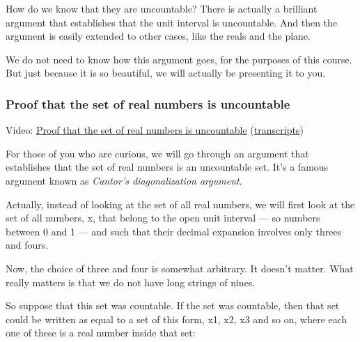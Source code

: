 \documentclass[pdftex, brazil, 12pt, twoside]{article}
\begin{document}
How do we know that they are uncountable?
There is actually a brilliant argument that establishes that
the unit interval is uncountable.
And then the argument is easily extended to other
cases, like the reals and the plane.

We do not need to know how this argument goes, for the
purposes of this course.
But just because it is so beautiful, we will actually be
presenting it to you.

\subsubsection{Proof that the set of real numbers is uncountable}
\label{un1-math-proof-real-uncountable}

Video: \href{https://www.youtube.com/watch?v=YiBwYemQajA}{Proof that the set of real numbers is uncountable}
(\href{Unit-1/02\_mathematical\_background/mb\_10\_transcripts.pdf}{transcripts})

For those of you who are curious, we will go through an
argument that establishes that the set of real numbers is an
uncountable set.
It's a famous argument known as \emph{Cantor's
  diagonalization argument}.

Actually, instead of looking at the set of all real
numbers, we will first look at the set of all numbers, x,
that belong to the open unit interval ---
so numbers between 0 and 1 ---
and such that their decimal expansion involves
only threes and fours.

\begin{figure}[H]
  \begin{center}
  \end{center}
\end{figure}

Now, the choice of three and four is somewhat arbitrary.
It doesn't matter.
What really matters is that we do not have
long strings of nines.

So suppose that this set was countable.
If the set was countable, then that set could be written as
equal to a set of this form, x1, x2, x3 and so on, where
each one of these is a real number inside that set:
\end{document}

